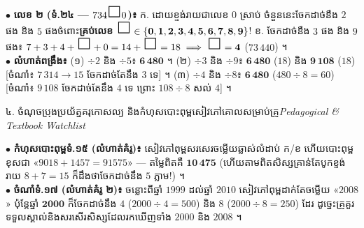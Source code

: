 \documentclass[a4paper,10pt]{article}
\newcommand{\en}[1]{{\TimesEn #1}}
\newcommand{\dbox}{\,\tikz[baseline=-0.35ex]\draw[black, line width=0.75pt, fill=white] (0,0) rectangle (0.38cm,0.38cm);\,}
\newcommand{\secstrip}[2]{%
  \vspace{3pt}%
  \begin{tcolorbox}[
    enhanced, sharp corners, colback=panelgray, colframe=black,
    boxrule=0.8pt, boxsep=0.8pt, top=2pt, bottom=2pt, left=5pt, right=5pt,
    after skip=3pt
  ]
    {\muol\fontsize{8.5pt}{12.2pt}\selectfont #1}\hfill{\fontsize{7.8pt}{10.8pt}\selectfont\textit{#2}}
  \end{tcolorbox}%
}
\begin{document}
\begin{tcolorbox}[
  enhanced, sharp corners, colback=white, colframe=black,
  boxrule=0.8pt, boxsep=2.5pt, top=4pt, bottom=4pt, left=6pt, right=6pt
]
  \fontsize{8.7pt}{12.8pt}\selectfont
  $\bullet$ \textbf{លេខ ២ (ទំ.២៤ — $734\dbox 0$)៖} ក. ដោយខ្ទង់រាយជាលេខ $0$ ស្រាប់ ចំនួននេះចែកដាច់នឹង $2$ ផង និង $5$ ផងចំពោះ\textbf{គ្រប់លេខ} $\dbox \in \mathbf{\{0,1,2,3,4,5,6,7,8,9\}}$! ខ. ចែកដាច់នឹង $3$ ផង និង $9$ ផង៖ $7+3+4+\dbox+0 = 14+\dbox = 18 \implies \dbox = \mathbf{4}$ ($73\,440$) ។\\[2pt]
  $\bullet$ \textbf{លំហាត់ពង្រឹង៖} (១) $\div 2$ និង $\div 5$៖ $\mathbf{6\,480}$ ។ (២) $\div 3$ និង $\div 9$៖ $\mathbf{6\,480}$ ($18$) និង $\mathbf{9\,108}$ ($18$) [ចំណាំ៖ $7\,314 \to 15$ ចែកដាច់តែនឹង $3$ ទេ] ។ (៣) $\div 4$ និង $\div 8$៖ $\mathbf{6\,480}$ ($480\div 8=60$) [ចំណាំ៖ $9\,108$ ចែកដាច់តែនឹង $4$ ទេ ព្រោះ $108\div 8$ សល់ $4$] ។
\end{tcolorbox}

\vfill
\secstrip{៤. ចំណុចប្រុងប្រយ័ត្នគរុកោសល្យ និងកំហុសបោះពុម្ពសៀវភៅគោលសម្រាប់គ្រូ}{\en{Pedagogical \& Textbook Watchlist}}

\begin{tcolorbox}[
  enhanced, sharp corners, colback=panelgray, colframe=black,
  boxrule=0.85pt, boxsep=2.5pt, top=4pt, bottom=4pt, left=6pt, right=6pt
]
  \fontsize{8.6pt}{12.6pt}\selectfont
  $\bullet$ \textbf{កំហុសបោះពុម្ពទំ.១៥ (លំហាត់គំរូ)៖} សៀវភៅពុម្ពសរសេរចម្លើយឆ្លាស់លំដាប់ ក/ខ ហើយបោះពុម្ពខុសជា «$9018+1457 = 91575$» — តម្លៃពិតគឺ $\mathbf{10\,475}$ (ហើយតាមពិតសិស្សគ្រាន់តែបូកខ្ទង់រាយ $8+7=15$ ក៏ដឹងថាចែកដាច់នឹង $5$ ភ្លាម!) ។\\[2pt]
  $\bullet$ \textbf{ចំណាំទំ.១៧ (លំហាត់គំរូ ២)៖} ចន្លោះពីឆ្នាំ $1999$ ដល់ឆ្នាំ $2010$ សៀវភៅពុម្ពដាក់តែចម្លើយ «$2008$» ប៉ុន្តែឆ្នាំ $\mathbf{2000}$ ក៏ចែកដាច់នឹង $4$ ($2000\div 4=500$) និង $8$ ($2000\div 8=250$) ដែរ ដូច្នេះគ្រូគួរទទួលស្គាល់និងសរសើរសិស្សដែលរកឃើញទាំង $2000$ និង $2008$ ។
\end{tcolorbox}
\end{document}
